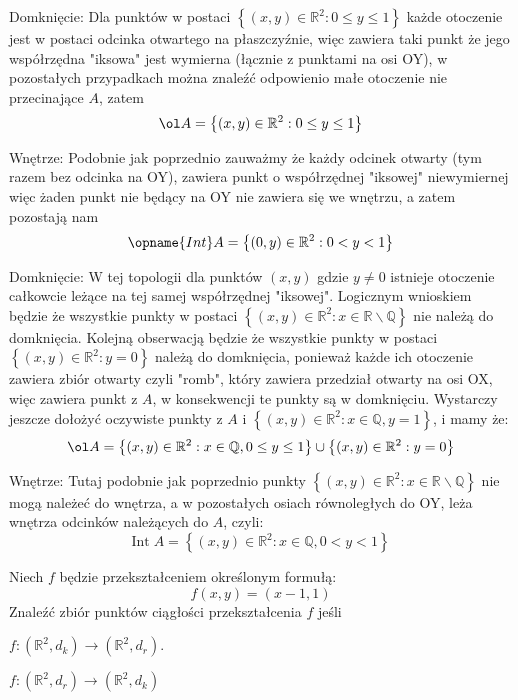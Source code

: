 \documentclass[11pt]{scrartcl}
\begin{document}
    \begin{walk}
        \item Domknięcie:
          Dla punktów w postaci $\left \{ (x,y) \in \mathbb{R}^2 : 0 \leq y \leq 1 \right \}$ każde otoczenie jest w postaci odcinka otwartego na płaszczyźnie, więc zawiera taki punkt że jego współrzędna "iksowa" jest wymierna (łącznie z punktami na osi OY), w pozostałych przypadkach można znaleźć odpowienio małe otoczenie nie przecinające $A$, zatem
          \[
            \ol A = \left \{ (x, y) \in \mathbb{R}^2 : 0 \leq y \leq 1 \right \}
          \]

          Wnętrze:
          Podobnie jak poprzednio zauważmy że każdy odcinek otwarty (tym razem bez odcinka na OY), zawiera punkt o współrzędnej "iksowej" niewymiernej więc żaden punkt nie będący na OY nie zawiera się we wnętrzu, a zatem pozostają nam
          \[
            \opname{Int} A = \left \{ (0,y) \in \mathbb{R}^2 : 0 < y < 1 \right \}
          \]
        \item Domknięcie:
          W tej topologii dla punktów $(x,y)$ gdzie $y \not = 0$ istnieje otoczenie całkowcie leżące na tej samej współrzędnej "iksowej". Logicznym wnioskiem będzie że wszystkie punkty w postaci $\left \{ (x,y) \in \mathbb{R}^2 : x \in \mathbb{R} \backslash \mathbb{Q} \right \}$ nie należą do domknięcia. Kolejną obserwacją będzie że wszystkie punkty w postaci $\left \{ (x,y) \in \mathbb{R}^2 : y = 0 \right \}$ należą do domknięcia, ponieważ każde ich otoczenie zawiera zbiór otwarty czyli "romb", który zawiera przedział otwarty na osi OX, więc zawiera punkt z $A$, w konsekwencji te punkty są w domknięciu. Wystarczy jeszcze dołożyć oczywiste punkty z $A$ i $\left \{ (x,y) \in \mathbb{R}^2 : x \in \mathbb{Q}, y = 1 \right \}$, i mamy że:
          \[
              \ol A = \left \{ (x,y) \in \mathbb{R}^2 : x \in \mathbb{Q} , 0 \leq y \leq 1 \right \} \cup \left \{ (x,y) \in \mathbb{R}^2 : y = 0 \right \}
          \]

          Wnętrze: 
          Tutaj podobnie jak poprzednio punkty $\left \{ (x,y) \in \mathbb{R}^2 : x \in \mathbb{R} \backslash \mathbb{Q} \right \}$ nie mogą należeć do wnętrza, a w pozostałych osiach równoległych do OY, leża wnętrza odcinków należących do $A$, czyli:
          \[
            \text{Int} \; A = \left \{ (x,y) \in \mathbb{R}^2 : x \in \mathbb{Q} , 0 < y < 1 \right \}
          \]
    \end{walk}

    \begin{zadanie*}
        Niech $f$ będzie przekształceniem określonym formułą:
        \[
            f(x,y) = (x - 1, 1)
        \]
        Znaleźć zbiór punktów ciągłości przekształcenia $f$ jeśli
        \begin{walk}
            \item $f : \left ( \mathbb{R}^2 , d_k  \right ) \to  \left ( \mathbb{R}^2, d_r \right )$. 
            \item $f : \left ( \mathbb{R}^2 , d_r \right ) \to \left ( \mathbb{R}^2, d_k \right )$
        \end{walk}
    \end{zadanie*}
    
\end{document}
